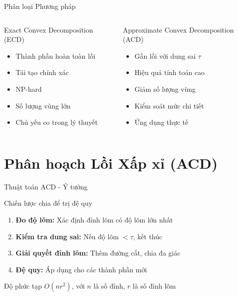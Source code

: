 \documentclass[aspectratio=169]{beamer}
\begin{document}
\begin{frame}{Phân loại Phương pháp}
    \begin{columns}[T]
        \begin{block}{Exact Convex Decomposition (ECD)}
            \begin{itemize}
                \item Thành phần hoàn toàn lồi
                \item Tái tạo chính xác
                \item NP-hard
                \item Số lượng vùng lớn
                \item Chủ yếu co trong lý thuyết
            \end{itemize}
        \end{block}

        \begin{alertblock}{Approximate Convex Decomposition (ACD)}
            \begin{itemize}
                \item Gần lồi với dung sai $\tau$
                \item Hiệu quả tính toán cao
                \item Giảm số lượng vùng
                \item Kiểm soát mức chi tiết
                \item Ứng dụng thực tế
            \end{itemize}
        \end{alertblock}
    \end{columns}
\end{frame}


\section{Phân hoạch Lồi Xấp xỉ (ACD)}

\begin{frame}{Thuật toán ACD - Ý tưởng}

    \begin{exampleblock}{Chiến lược chia để trị đệ quy}
        \begin{enumerate}
            \item \textbf{Đo độ lõm:} Xác định đỉnh lõm có độ lõm lớn nhất
            \item \textbf{Kiểm tra dung sai:} Nếu độ lõm $< \tau$, kết thúc
            \item \textbf{Giải quyết đỉnh lõm:} Thêm đường cắt, chia đa giác
            \item \textbf{Đệ quy:} Áp dụng cho các thành phần mới
        \end{enumerate}
    \end{exampleblock}

    \begin{block}{Độ phức tạp}
        $O(n r^2)$, với $n$ là số đỉnh, $r$ là số đỉnh lõm
    \end{block}

\end{frame}
\end{document}
